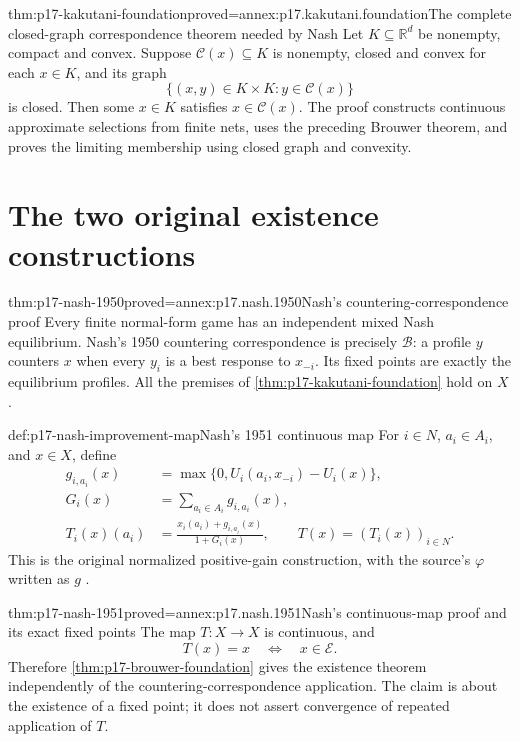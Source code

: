 \begin{hbtheorem}{thm:p17-kakutani-foundation}{proved=annex:p17.kakutani.foundation}{The complete closed-graph correspondence theorem needed by Nash}
Let \(K\subseteq\mathbb R^d\) be nonempty, compact and convex.
Suppose \(\mathcal C(x)\subseteq K\) is nonempty, closed and
convex for each \(x\in K\), and its graph
\[
                   \{(x,y)\in K\times K:y\in\mathcal C(x)\}
\]
is closed. Then some \(x\in K\) satisfies \(x\in\mathcal C(x)\).
The proof constructs continuous approximate selections from finite
nets, uses the preceding Brouwer theorem, and proves the limiting
membership using closed graph and convexity.
\end{hbtheorem}

\section{The two original existence constructions}

\begin{hbtheorem}{thm:p17-nash-1950}{proved=annex:p17.nash.1950}{Nash's countering-correspondence proof}
Every finite normal-form game has an independent mixed Nash
equilibrium. Nash's 1950 countering correspondence is precisely
\(\mathcal B\): a profile \(y\) counters \(x\) when every \(y_i\)
is a best response to \(x_{-i}\). Its fixed points are exactly
the equilibrium profiles. All the premises of
\cref{thm:p17-kakutani-foundation} hold on \(X\)
\cite[pp.~48--49]{Nash1950EquilibriumPoints}.
\end{hbtheorem}

\begin{hbdefinition}{def:p17-nash-improvement-map}{Nash's 1951 continuous map}
For \(i\in N\), \(a_i\in A_i\), and \(x\in X\), define
\[
\begin{aligned}
 g_{i,a_i}(x)&=\max\{0,U_i(a_i,x_{-i})-U_i(x)\},\\
 G_i(x)&=\sum_{a_i\in A_i}g_{i,a_i}(x),\\
 T_i(x)(a_i)&=\frac{x_i(a_i)+g_{i,a_i}(x)}{1+G_i(x)},\qquad
                          T(x)=(T_i(x))_{i\in N}.
\end{aligned}
\]
This is the original normalized positive-gain construction,
with the source's \(\varphi\) written as \(g\)
\cite[p.~288, theorem~1]{Nash1951NonCooperative}.
\end{hbdefinition}

\begin{hbtheorem}{thm:p17-nash-1951}{proved=annex:p17.nash.1951}{Nash's continuous-map proof and its exact fixed points}
The map \(T:X\to X\) is continuous, and
\[
                              T(x)=x\quad\Longleftrightarrow\quad x\in\mathcal E.
\]
Therefore \cref{thm:p17-brouwer-foundation} gives the existence
theorem independently of the countering-correspondence application.
The claim is about the existence of a fixed point; it does not
assert convergence of repeated application of \(T\).
\end{hbtheorem}

